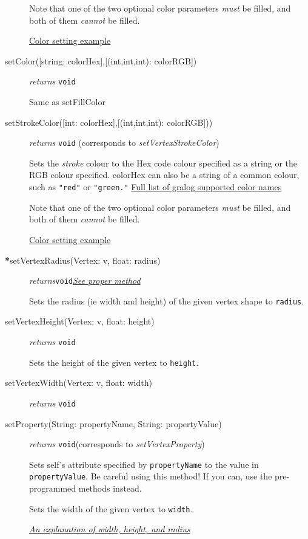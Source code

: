 \documentclass{article}
\newcounter{example}
\newlength\q
\begin{document}
\begin{description}
Note that one of the two optional color parameters \textit{must} be filled, and both of them \textit{cannot} be filled.

\hyperref[colorNamesSupportedByGralog]{Color setting example}

\item[setColor({[string: colorHex]},{[(int,int,int): colorRGB]})]\emph{returns}
  \texttt{void}
  
Same as setFillColor

\label{setVertexStrokeColorClass}\item[setStrokeColor({[int: colorHex]},{[(int,int,int): colorRGB]}))] \emph{returns} \texttt{void} (corresponds to \textit{setVertexStrokeColor})

Sets the \textit{stroke} colour to the Hex code colour
specified as a string or the RGB colour specified. colorHex can also be
a string of a common colour, such as \texttt{"red"} or
\texttt{"green."} \hyperref[colorNamesSupportedByGralog]{Full list of gralog supported color names}

Note that one of the two optional color parameters \textit{must} be filled, and both of them \textit{cannot} be filled.

\hyperref[colorNamesSupportedByGralog]{Color setting example}

\item[\textbf{*}setVertexRadius(Vertex: v, float: radius)] \emph{returns}\texttt{void}\quad \hyperref[setVertexRadiusClass]{\textit{See proper method}}


Sets the radius (ie width and height) of the given vertex shape to \texttt{radius}.

\item[setVertexHeight(Vertex: v, float: height)] \emph{returns}
  \texttt{void}

Sets the height of the given vertex to \texttt{height}.

\item[setVertexWidth(Vertex: v, float: width)] \emph{returns}
  \texttt{void}
  
\label{setVertexPropertyClass}\item[setProperty(String: propertyName, String: propertyValue)] \emph{returns} \texttt{void}\quad(corresponds to \textit{setVertexProperty})

Sets self's attribute specified by \texttt{propertyName} to the value in \texttt{propertyValue}. Be careful using this method! If you can, use the pre-programmed methods instead.

Sets the width of the given vertex to \texttt{width}. 

\hyperref[radiusWidthHeightDiagram]{\textit{An explanation of width, height, and radius}}

\end{description}
\end{document}
